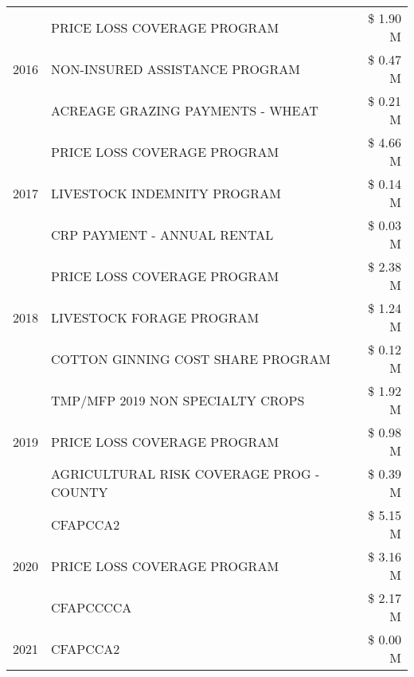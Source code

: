 \begin{tabular}{llr}
\cline{1-3}
\multirow[t]{3}{*}{2016} & PRICE LOSS COVERAGE PROGRAM & \$ 1.90 M \\
 & NON-INSURED ASSISTANCE PROGRAM & \$ 0.47 M \\
 & ACREAGE GRAZING PAYMENTS - WHEAT & \$ 0.21 M \\
\cline{1-3}
\multirow[t]{3}{*}{2017} & PRICE LOSS COVERAGE PROGRAM & \$ 4.66 M \\
 & LIVESTOCK INDEMNITY PROGRAM & \$ 0.14 M \\
 & CRP PAYMENT - ANNUAL RENTAL & \$ 0.03 M \\
\cline{1-3}
\multirow[t]{3}{*}{2018} & PRICE LOSS COVERAGE PROGRAM & \$ 2.38 M \\
 & LIVESTOCK FORAGE PROGRAM & \$ 1.24 M \\
 & COTTON GINNING COST SHARE PROGRAM & \$ 0.12 M \\
\cline{1-3}
\multirow[t]{3}{*}{2019} & TMP/MFP 2019 NON SPECIALTY CROPS & \$ 1.92 M \\
 & PRICE LOSS COVERAGE PROGRAM & \$ 0.98 M \\
 & AGRICULTURAL RISK COVERAGE PROG - COUNTY & \$ 0.39 M \\
\cline{1-3}
\multirow[t]{3}{*}{2020} & CFAPCCA2 & \$ 5.15 M \\
 & PRICE LOSS COVERAGE PROGRAM & \$ 3.16 M \\
 & CFAPCCCCA & \$ 2.17 M \\
\cline{1-3}
2021 & CFAPCCA2 & \$ 0.00 M \\
\cline{1-3}
\bottomrule
\end{tabular}

